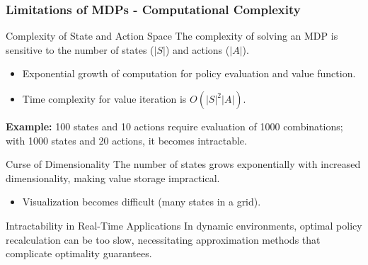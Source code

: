 \documentclass[aspectratio=169]{beamer}
\begin{document}
\begin{frame}[fragile]
    \frametitle{Limitations of MDPs - Computational Complexity}
    \begin{block}{Complexity of State and Action Space}
        The complexity of solving an MDP is sensitive to the number of states ($|S|$) and actions ($|A|$). 
        \begin{itemize}
            \item Exponential growth of computation for policy evaluation and value function.
            \item Time complexity for value iteration is $O(|S|^2 |A|)$.
        \end{itemize}
        \textbf{Example:} 100 states and 10 actions require evaluation of 1000 combinations; with 1000 states and 20 actions, it becomes intractable.
    \end{block}

    \begin{block}{Curse of Dimensionality}
        The number of states grows exponentially with increased dimensionality, making value storage impractical. 
        \begin{itemize}
            \item Visualization becomes difficult (many states in a grid).
        \end{itemize}
    \end{block}

    \begin{block}{Intractability in Real-Time Applications}
        In dynamic environments, optimal policy recalculation can be too slow, necessitating approximation methods that complicate optimality guarantees.
    \end{block}
\end{frame}
\end{document}

